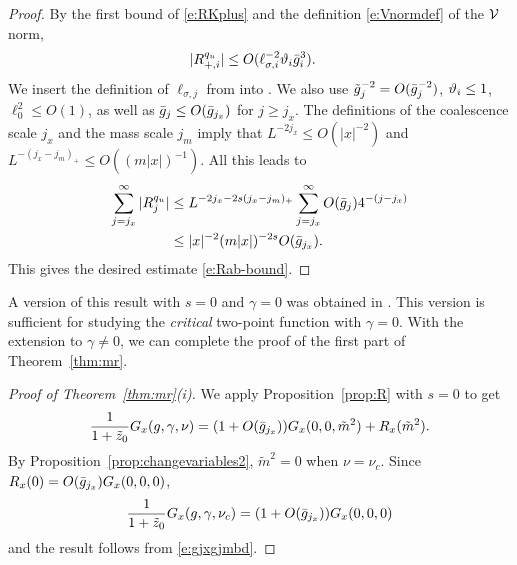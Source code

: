 \begin{proof}
By the first bound of \eqref{e:RKplus} and the definition \eqref{e:Vnormdef}
of the $\mathcal{V}$ norm,
\begin{align}
\label{e:vq-new}
    |R^{q_u}_{+,i}|
&
\le O(\ell_{\sigma,i}^{-2}\vartheta_i\bar{g}_i^{3}).
\end{align}
We insert the definition of $\ell_{\sigma,j}$ from  into .
We also use $\tilde{g}_j^{-2} = O(\bar{g}_j^{-2})$, $\vartheta_i \le 1$, $\ell_0^2 \le O(1)$,
as well as $\bar{g}_{j} \leq O(\bar{g}_{j_{x}})$ for $j \geq j_x$.
The definitions of
the coalescence scale $j_x$ and the mass scale $j_m$ imply that  $L^{-2j_x} \le O(|x|^{-2})$
and $L^{ -  (j_{x} - j_m)_+} \le O((m|x|)^{-1})$.
All this leads to
\begin{align}
\sum_{j = j_{x}}^\infty |R^{q_u}_j|
	&\leq
L^{-2j_{x} - 2s (j_{x} - j_m)_+}
\sum_{j = j_{x}}^\infty O(\bar{g}_{j}) 4^{-(j - j_{x})}
	\nonumber \\
	&\leq
|x|^{-2} (m|x|)^{-2s} O(\bar{g}_{j_{x}})
.
\label{e:vq-sum}
\end{align}
This gives the desired estimate \eqref{e:Rab-bound}.
\end{proof}

A version of this result with $s = 0$ and $\gamma = 0$ was obtained in \cite{BBS-saw4,ST-phi4}.
This version is sufficient for studying the \emph{critical} two-point function with $\gamma = 0$.
With the extension to $\gamma \ne 0$, we can complete the proof of the first part of
Theorem~\ref{thm:mr}.

\begin{proof}[Proof of Theorem~\ref{thm:mr}(i)]
We apply Proposition~\ref{prop:R} with $s = 0$ to get
\begin{equation}
\frac{1}{1 + \tilde z_0} G_x(g, \gamma, \nu)
	=
(1 + O(\bar{g}_{j_x})) G_x(0, 0, \tilde m^2) + R_x(\tilde m^2).
\end{equation}
By Proposition~\ref{prop:changevariables2}, $\tilde m^2 = 0$
when $\nu = \nu_c$. Since $R_x(0) = O(\bar{g}_{j_x}) G_x(0, 0, 0)$,
\begin{equation}
\frac{1}{1 + \tilde z_0} G_x(g, \gamma, \nu_c)
	=
(1 + O(\bar{g}_{j_x})) G_x(0, 0, 0)
\end{equation}
and the result follows from \eqref{e:gjxgjmbd}.
\end{proof}


